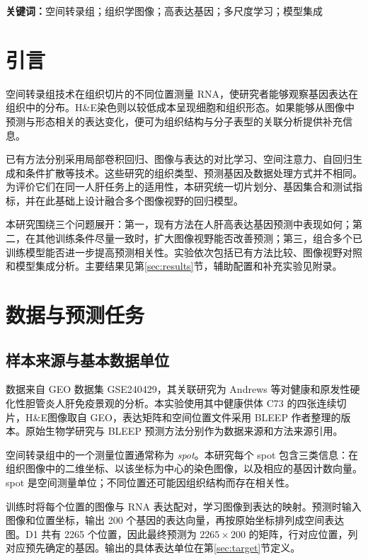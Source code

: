 \documentclass[UTF8,a4paper,11pt,fontset=fandol]{ctexart}
\newcommand{\HE}{H\&E}
\begin{document}
\noindent\textbf{关键词：}空间转录组；组织学图像；高表达基因；多尺度学习；模型集成
\clearpage\tableofcontents
\clearpage\listoffigures
\clearpage{}

\section{引言}
空间转录组技术在组织切片的不同位置测量 RNA，使研究者能够观察基因表达在组织中的分布。\HE 染色则以较低成本呈现细胞和组织形态。如果能够从图像中预测与形态相关的表达变化，便可为组织结构与分子表型的关联分析提供补充信息。

已有方法分别采用局部卷积回归、图像与表达的对比学习、空间注意力、自回归生成和条件扩散等技术\cite{stnet,bleep,ressat,genar,stem}。这些研究的组织类型、预测基因及数据处理方式并不相同。为评价它们在同一人肝任务上的适用性，本研究统一切片划分、基因集合和测试指标，并在此基础上设计融合多个图像视野的回归模型。

本研究围绕三个问题展开：第一，现有方法在人肝高表达基因预测中表现如何；第二，在其他训练条件尽量一致时，扩大图像视野能否改善预测；第三，组合多个已训练模型能否进一步提高预测相关性。实验依次包括已有方法比较、图像视野对照和模型集成分析。主要结果见第\ref{sec:results}节，辅助配置和补充实验见附录。

\section{数据与预测任务}
\subsection{样本来源与基本数据单位}
数据来自 GEO 数据集 GSE240429，其关联研究为 Andrews 等对健康和原发性硬化性胆管炎人肝免疫景观的分析\cite{andrews,geo}。本实验使用其中健康供体 C73 的四张连续切片，\HE 图像取自 GEO，表达矩阵和空间位置文件采用 BLEEP 作者整理的版本\cite{bleep}。原始生物学研究与 BLEEP 预测方法分别作为数据来源和方法来源引用。

空间转录组中的一个测量位置通常称为 \textit{spot}。本研究每个 spot 包含三类信息：在组织图像中的二维坐标、以该坐标为中心的染色图像，以及相应的基因计数向量。spot 是空间测量单位；不同位置还可能因组织结构而存在相关性。

训练时将每个位置的图像与 RNA 表达配对，学习图像到表达的映射。预测时输入图像和位置坐标，输出 200 个基因的表达向量，再按原始坐标排列成空间表达图。D1 共有 2265 个位置，因此最终预测为 $2265\times200$ 的矩阵，行对应位置，列对应预先确定的基因。输出的具体表达单位在第\ref{sec:target}节定义。
\end{document}
